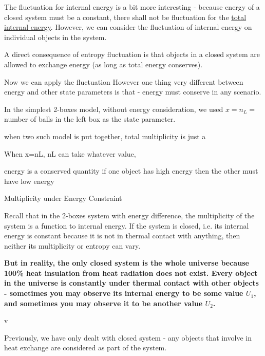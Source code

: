 \documentclass[class=article, crop=false, 12pt]{standalone}
\begin{document}
The fluctuation for internal energy is a bit more interesting - 
because energy of a closed system must be a constant, 
there shall not be fluctuation for the \ul{total internal energy}.
However, we can consider the fluctuation of internal energy on individual objects in the system.


A direct consequence of entropy fluctuation is that objects in a closed system are allowed to exchange energy
(as long as total energy conserves).



Now we can apply the fluctuation 
However one thing very different between energy and other state parameters is that -
energy must conserve in any scenario. 






In the simplest 2-boxes model, without energy consideration,
we used $x=n_L=$ number of balls in the left box as the state parameter. 

when two such model is put together,
total multiplicity is just a 

When x=nL, 
nL can take whatever value, 

energy is a conserved quantity
if one object has high energy then the other must have low energy

Multiplicity under Energy Constraint



Recall that in the 2-boxes system with energy difference,
the multiplicity of the system is a function to internal energy.
If the system is closed, 
i.e. its internal energy is constant because it is not in thermal contact with anything, 
then neither its multiplicity or entropy can vary.


\bf{But in reality, the only closed system is the whole universe}
because 100\% heat insulation from heat radiation does not exist.
Every object in the universe is constantly under thermal contact with other objects - 
sometimes you may observe its internal energy to be some value $U_1$,
and sometimes you may observe it to be another value $U_2$.

v
\begin{center}
\end{center}




Previously, we have only dealt with closed system - 
any objects that involve in heat exchange are considered as part of the system.
\\
\end{document}
